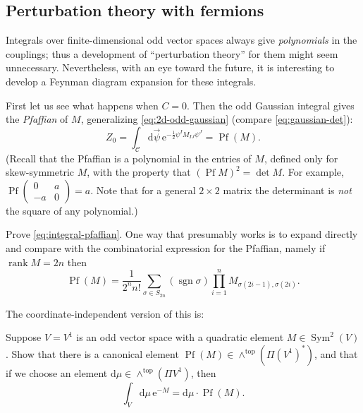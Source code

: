 \documentclass[12pt,letterpaper,reqno]{article}
\numberwithin{equation}{section}
\newcommand{\cC}{\ensuremath{\mathcal C}}
\newcommand{\half}{\ensuremath{\frac{1}{2}}}
\newcommand{\e}{{\mathrm e}}
\newcommand{\de}{\mathrm{d}}
\newcommand{\rmtop}{\mathrm{top}}
\newcommand{\ti}[1]{\textit{#1}}
\DeclareMathOperator{\sgn}{sgn}
\DeclareMathOperator{\Sym}{Sym}
\DeclareMathOperator{\rank}{rank}
\DeclareMathOperator{\Pf}{Pf}
\begin{document}
\subsection{Perturbation theory with fermions} \label{sec:perturbation-theory-0d}

Integrals over finite-dimensional 
odd vector spaces always give \ti{polynomials} in the couplings; 
thus a development of
``perturbation theory'' for them might seem unnecessary.
Nevertheless, with an eye toward the future, it is interesting to
develop a Feynman diagram expansion for these integrals.

First let us see what happens when $C = 0$.
Then the odd Gaussian integral gives the \ti{Pfaffian} of $M$,
generalizing \eqref{eq:2d-odd-gaussian}
(compare \eqref{eq:gaussian-det}):
\begin{equation} \label{eq:integral-pfaffian}
  Z_0 = \int_\cC \de \vec\psi \, \e^{-\half \psi^I M_{IJ} \psi^J} = \Pf (M).
\end{equation}
(Recall that the Pfaffian is a polynomial in the entries of $M$, defined
only for skew-symmetric $M$, with the property that $(\Pf M)^2 = \det M$.
For example, $\Pf \begin{pmatrix} 0 & a \\ -a & 0 \end{pmatrix} = a$. Note that
for a general $2 \times 2$ matrix the determinant is \ti{not} the square of 
any polynomial.)
\begin{exercise} Prove \eqref{eq:integral-pfaffian}. One way that
presumably works is to expand directly and compare with the
combinatorial expression for the Pfaffian, namely if $\rank M = 2n$ then
\begin{equation}
  \Pf(M) = \frac{1}{2^n n!} \sum_{\sigma \in S_{2n}} (\sgn \sigma) \prod_{i=1}^n M_{\sigma(2i-1), \sigma(2i)}.
\end{equation}
\end{exercise}
The coordinate-independent version of this is:
\begin{exercise}
  Suppose $V = V^1$ is an odd vector space with a quadratic 
  element $M \in \Sym^2(V)$. Show that there is a canonical element
  $\Pf(M) \in \wedge^\rmtop(\Pi (V^1)^*)$, 
  and that if we choose an element
  $\de \mu \in \wedge^\rmtop(\Pi V^1)$, then
  \begin{equation}
    \int_V \de \mu \, \e^{-M} = \de \mu \cdot \Pf(M).
  \end{equation}
\end{exercise}
\end{document}
